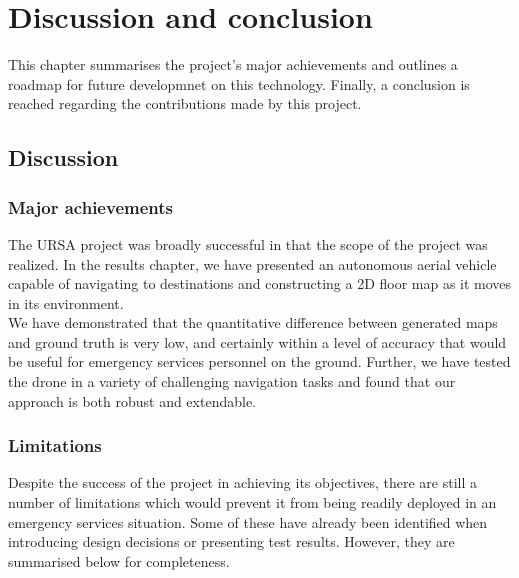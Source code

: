 \documentclass[capstone_report.tex]{subfiles}
\begin{document}
\chapter{Discussion and conclusion}
This chapter summarises the project's major achievements and outlines a roadmap for future developmnet on this technology. Finally, a conclusion is reached regarding the contributions made by this project.

\section{Discussion}
\subsection{Major achievements}
The URSA project was broadly successful in that the scope of the project was realized. In the results chapter, we have presented an autonomous aerial vehicle capable of navigating to destinations and constructing a 2D floor map as it moves in its environment.\\

We have demonstrated that the quantitative difference between generated maps and ground truth is very low, and certainly within a level of accuracy that would be useful for emergency services personnel on the ground. Further, we have tested the drone in a variety of challenging navigation tasks and found that our approach is both robust and extendable.

\subsection{Limitations}
Despite the success of the project in achieving its objectives, there are still a number of limitations which would prevent it from being readily deployed in an emergency services situation. Some of these have already been identified when introducing design decisions or presenting test results. However, they are summarised below for completeness.\\
\end{document}
